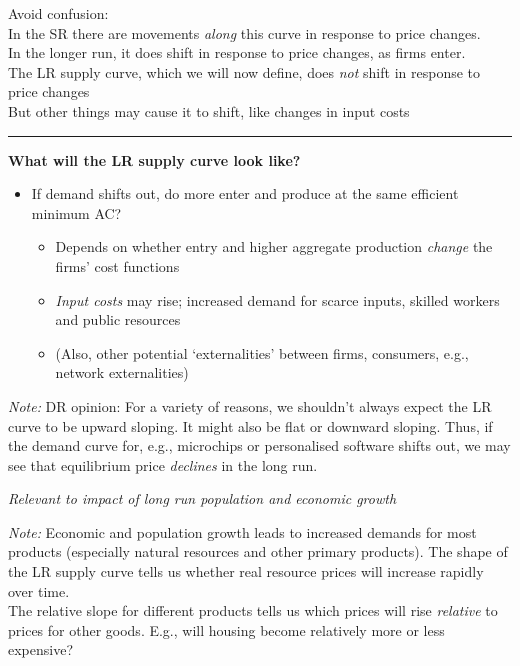 \documentclass[]{article}
\providecommand{\tightlist}{%
  \setlength{\itemsep}{0pt}\setlength{\parskip}{0pt}}
\begin{document}
Avoid confusion:\\
In the SR there are movements \emph{along} this curve in response to
price changes.\\
In the longer run, it does shift in response to price changes, as firms
enter.\\
The LR supply curve, which we will now define, does \emph{not} shift in
response to price changes\\
But other things may cause it to shift, like changes in input costs

\begin{center}\rule{0.5\linewidth}{\linethickness}\end{center}

\textbf{What will the LR supply curve look like?}

\begin{itemize}
\tightlist
\item
  If demand shifts out, do more enter and produce at the same efficient
  minimum AC?

  \begin{itemize}
  \tightlist
  \item
    Depends on whether entry and higher aggregate production
    \emph{change} the firms' cost functions
  \item
    \emph{Input costs} may rise; increased demand for scarce inputs,
    skilled workers and public resources
  \item
    (Also, other potential `externalities' between firms, consumers,
    e.g., network externalities)
  \end{itemize}
\end{itemize}

\emph{Note:} DR opinion: For a variety of reasons, we shouldn't always
expect the LR curve to be upward sloping. It might also be flat or
downward sloping. Thus, if the demand curve for, e.g., microchips or
personalised software shifts out, we may see that equilibrium price
\emph{declines} in the long run.

\bigskip

\emph{Relevant to impact of long run population and economic growth}

\emph{Note:} Economic and population growth leads to increased demands
for most products (especially natural resources and other primary
products). The shape of the LR supply curve tells us whether real
resource prices will increase rapidly over time.\\
The relative slope for different products tells us which prices will
rise \emph{relative} to prices for other goods. E.g., will housing
become relatively more or less expensive?
\end{document}
